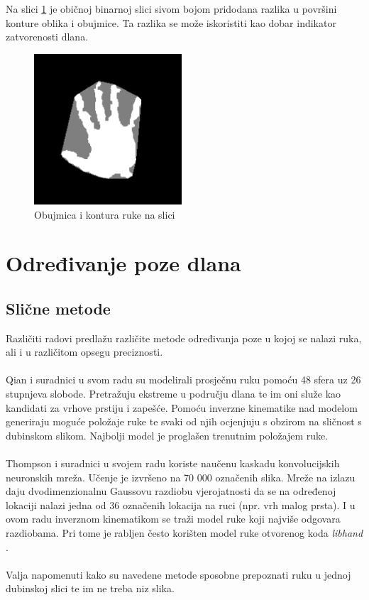 \documentclass[times, utf8, diplomski, numeric]{fer}
\begin{document}
\begin{enumerate}[label=$\bullet$]
Na slici \ref{convex_hull} je običnoj binarnoj slici sivom bojom pridodana razlika u površini konture oblika i obujmice. Ta razlika se može iskoristiti kao dobar indikator zatvorenosti dlana.

\begin{figure}[h!]
\centering
\includegraphics[width = 0.49\textwidth]{detekcija/obujmica}
\caption{Obujmica i kontura ruke na slici} \label{convex_hull}
\end{figure}

\end{enumerate}
\section{Određivanje poze dlana}

\subsection{Slične metode}
Različiti radovi predlažu različite metode određivanja poze u kojoj se nalazi ruka, ali i u različitom opsegu preciznosti.\\\\
Qian i suradnici u svom radu \cite{qian2014realtime} su modelirali prosječnu ruku pomoću 48 sfera uz 26 stupnjeva slobode. Pretražuju ekstreme u području dlana te im oni služe kao kandidati za vrhove prstiju i zapešće. Pomoću inverzne kinematike nad modelom generiraju moguće položaje ruke te svaki od njih ocjenjuju s obzirom na sličnost s dubinskom slikom. Najbolji model je proglašen trenutnim položajem ruke.\\\\
Thompson i suradnici u svojem radu \cite{tompson2014real} koriste naučenu kaskadu konvolucijskih neuronskih mreža. Učenje je izvršeno na 70 000 označenih slika. Mreže na izlazu daju dvodimenzionalnu Gaussovu razdiobu vjerojatnosti da se na određenoj lokaciji nalazi jedna od 36 označenih lokacija na ruci (npr. vrh malog prsta). I u ovom radu inverznom kinematikom se traži model ruke koji najviše odgovara razdiobama. Pri tome je rabljen često korišten model ruke otvorenog koda \textit{libhand} \cite{libhand}.\\\\
Valja napomenuti kako su navedene metode sposobne prepoznati ruku u jednoj dubinskoj slici te im ne treba niz slika.
\end{document}
